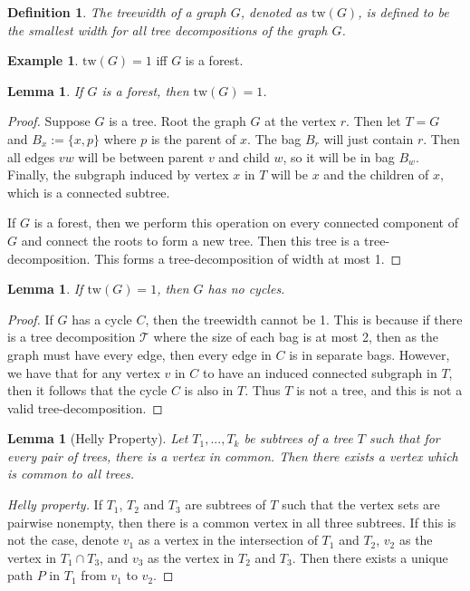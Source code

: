 \documentclass[]{report}
\newcommand{\tree}{\mathcal{T}}
\newcommand{\tw}{\text{tw}}
\newtheorem{lemma}[theorem]{Lemma}
\newtheorem{definition}[theorem]{Definition}
\theoremstyle{definition}
\newtheorem{example}[theorem]{Example}
\numberwithin{theorem}{section}
\numberwithin{equation}{section}
\begin{document}
\begin{definition}\label{def:treewidth}
	The treewidth of a graph $G$, denoted as $\tw(G)$, is defined to be the smallest width for all tree decompositions of the graph $G$.
\end{definition}


\begin{example}\label{ex:treewidth_forest}
	$\tw(G) = 1$ iff $G$ is a forest.
	\begin{lemma}
		If $G$ is a forest, then $\tw(G) = 1$.
	\end{lemma}
	\begin{proof}
		Suppose $G$ is a tree. Root the graph $G$ at the vertex $r$. Then let $T = G$ and $B_x:= \lbrace x, p \rbrace$ where $p$ is the parent of $x$. The bag $B_r$ will just contain $r$. Then all edges $vw$ will be between parent $v$ and child $w$, so it will be in bag $B_w$. Finally, the subgraph induced by vertex $x$ in $T$ will be $x$ and the children of $x$, which is a connected subtree.
		
		If $G$ is a forest, then we perform this operation on every connected component of $G$ and connect the roots to form a new tree. Then this tree is a tree-decomposition. This forms a tree-decomposition of width at most 1. 
	\end{proof}
	\begin{lemma}
		If $\tw(G) = 1$, then $G$ has no cycles.
	\end{lemma}
	\begin{proof}
		If $G$ has a cycle $C$, then the treewidth cannot be 1. This is because if there is a tree decomposition $\tree$ where the size of each bag is at most 2, then as the graph must have every edge, then every edge in $C$ is in separate bags. However, we have that for any vertex $v$ in $C$ to have an induced connected subgraph in $T$, then it follows that the cycle $C$ is also in $T$. Thus $T$ is not a tree, and this is not a valid tree-decomposition. 
	\end{proof}
\end{example}

\begin{lemma}[Helly Property]\label{lem:Helly}
	Let $T_1, ..., T_k$ be subtrees of a tree $T$ such that for every pair of trees, there is a vertex in common. Then there exists a vertex which is common to all trees.
\end{lemma}
\begin{proof}[Helly property]
	If $T_1$, $T_2$ and $T_3$ are subtrees of $T$ such that the vertex sets are pairwise nonempty, then there is a common vertex in all three subtrees. If this is not the case, denote $v_1$ as a vertex in the intersection of $T_1$ and $T_2$, $v_2$ as the vertex in $T_1 \cap T_3$, and $v_3$ as the vertex in $T_2$ and $T_3$. Then there exists a unique path $P$ in $T_1$ from $v_1$ to $v_2$.
\end{proof}
\end{document}
